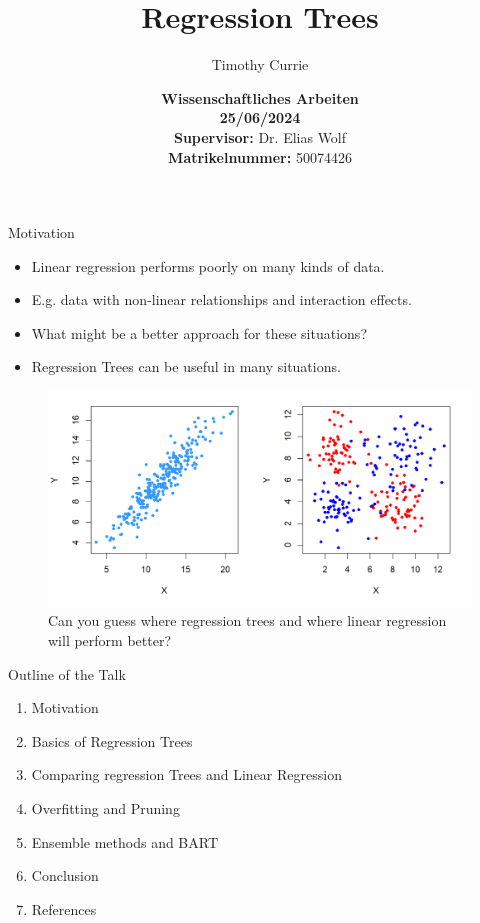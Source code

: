 \documentclass[10pt]{beamer}
\title{Regression Trees}
\author{Timothy Currie}
\institute{Universität Bonn}
\date{\vspace{2cm} \textbf{\large{Wissenschaftliches Arbeiten}} \\ \textbf{25/06/2024} \\ 
       \vspace{1cm} \textbf{Supervisor:} Dr. Elias Wolf \\ 
       \textbf{Matrikelnummer:} 50074426}
\begin{document}
\maketitle













\begin{frame}{Motivation}
    \begin{itemize}
        \item Linear regression performs poorly on many kinds of data.
        \item E.g. data with non-linear relationships and interaction effects.
        \item What might be a better approach for these situations?
            
        \item Regression Trees can be useful in many situations.
    \end{itemize}
 \begin{figure}
            \centering
            \includegraphics[scale=0.5]{Motivation Together.png}
            \caption{Can you guess where regression trees and where linear regression will perform better?}
            \label{fig:sub1}
        \end{figure}
\end{frame}






\begin{frame}{Outline of the Talk}
    \begin{large}
    \begin{enumerate}
        \item Motivation
        \item Basics of Regression Trees
        \item Comparing regression Trees and Linear Regression
        \item Overfitting and Pruning
        \item Ensemble methods and BART
        \item Conclusion
        \item References
    \end{enumerate}
    \end{large}
\end{frame}
\end{document}
